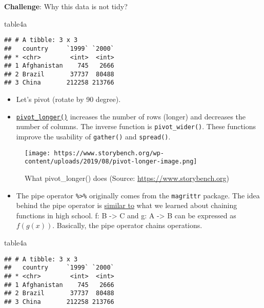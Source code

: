\documentclass[
]{book}
\newenvironment{Shaded}{\begin{snugshade}}{\end{snugshade}}
\newcommand{\NormalTok}[1]{#1}
\providecommand{\tightlist}{%
  \setlength{\itemsep}{0pt}\setlength{\parskip}{0pt}}
\begin{document}
\textbf{Challenge}: Why this data is not tidy?

\begin{Shaded}
\begin{Highlighting}[]
\NormalTok{table4a}
\end{Highlighting}
\end{Shaded}

\begin{verbatim}
## # A tibble: 3 x 3
##   country     `1999` `2000`
## * <chr>        <int>  <int>
## 1 Afghanistan    745   2666
## 2 Brazil       37737  80488
## 3 China       212258 213766
\end{verbatim}

\begin{itemize}
\item
  Let's pivot (rotate by 90 degree).
\item
  \href{https://tidyr.tidyverse.org/reference/pivot_longer.html}{\texttt{pivot\_longer()}} increases the number of rows (longer) and decreases the number of columns. The inverse function is \texttt{pivot\_wider()}. These functions improve the usability of \texttt{gather()} and \texttt{spread()}.
\end{itemize}

\begin{figure}
\centering
\texttt{[image: https://www.storybench.org/wp-content/uploads/2019/08/pivot-longer-image.png]}
\caption{What pivot\_longer() does (Source: \url{https://www.storybench.org})}
\end{figure}

\begin{itemize}
\tightlist
\item
  The pipe operator \texttt{\%\textgreater{}\%} originally comes from the \texttt{magrittr} package. The idea behind the pipe operator is \href{https://www.datacamp.com/community/tutorials/pipe-r-tutorial}{similar to} what we learned about chaining functions in high school. f: B -\textgreater{} C and g: A -\textgreater{} B can be expressed as \(f(g(x))\). Basically, the pipe operator chains operations.
\end{itemize}

\begin{Shaded}
\begin{Highlighting}[]
\NormalTok{table4a}
\end{Highlighting}
\end{Shaded}

\begin{verbatim}
## # A tibble: 3 x 3
##   country     `1999` `2000`
## * <chr>        <int>  <int>
## 1 Afghanistan    745   2666
## 2 Brazil       37737  80488
## 3 China       212258 213766
\end{verbatim}
\end{document}
